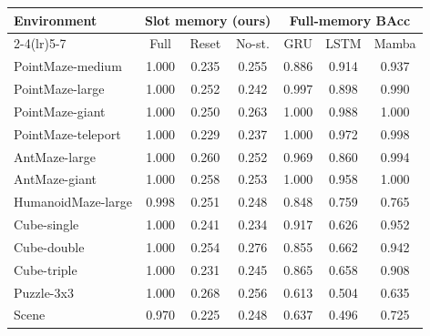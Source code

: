 \begin{tabular}{lcccccc}
\toprule
\multirow{2}{*}{Environment} & \multicolumn{3}{c}{Slot memory (ours)} & \multicolumn{3}{c}{Full-memory BAcc}\\
\cmidrule(lr){2-4}\cmidrule(lr){5-7}
 & Full & Reset & No-st. & GRU & LSTM & Mamba\\
\midrule
PointMaze-medium & 1.000 & 0.235 & 0.255 & 0.886 & 0.914 & 0.937\\
PointMaze-large & 1.000 & 0.252 & 0.242 & 0.997 & 0.898 & 0.990\\
PointMaze-giant & 1.000 & 0.250 & 0.263 & 1.000 & 0.988 & 1.000\\
PointMaze-teleport & 1.000 & 0.229 & 0.237 & 1.000 & 0.972 & 0.998\\
AntMaze-large & 1.000 & 0.260 & 0.252 & 0.969 & 0.860 & 0.994\\
AntMaze-giant & 1.000 & 0.258 & 0.253 & 1.000 & 0.958 & 1.000\\
HumanoidMaze-large & 0.998 & 0.251 & 0.248 & 0.848 & 0.759 & 0.765\\
Cube-single & 1.000 & 0.241 & 0.234 & 0.917 & 0.626 & 0.952\\
Cube-double & 1.000 & 0.254 & 0.276 & 0.855 & 0.662 & 0.942\\
Cube-triple & 1.000 & 0.231 & 0.245 & 0.865 & 0.658 & 0.908\\
Puzzle-3x3 & 1.000 & 0.268 & 0.256 & 0.613 & 0.504 & 0.635\\
Scene & 0.970 & 0.225 & 0.248 & 0.637 & 0.496 & 0.725\\
\bottomrule
\end{tabular}
